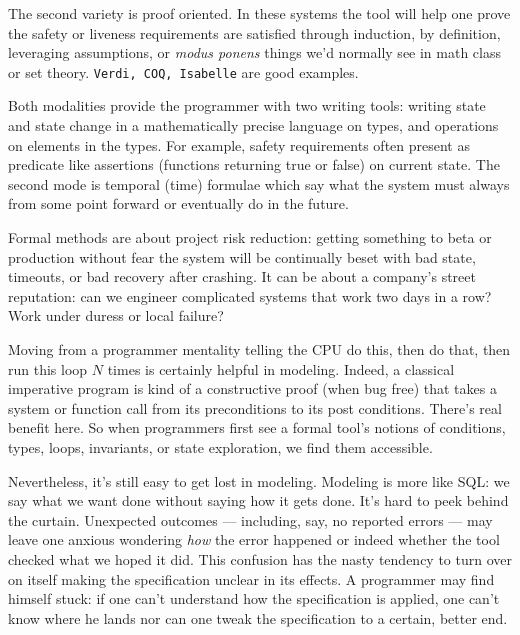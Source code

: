 \documentclass[twocolumn]{article}
\begin{document}
The second variety is proof oriented. In these systems the tool will help one prove the safety or liveness requirements are satisfied through induction, by definition, leveraging assumptions, or \emph{modus ponens} things we'd normally see in math class or set theory. \texttt{Verdi, COQ, Isabelle} are good examples.

Both modalities provide the programmer with two writing tools: writing state and state change in a mathematically precise language on types, and operations on elements in the types. For example, safety requirements often present as predicate like assertions (functions returning true or false) on current state. The second mode is temporal (time) formulae which say what the system must always from some point forward or eventually do in the future.  

Formal methods are about project risk reduction: getting something to beta or production without fear the system will be continually beset with bad state, timeouts, or bad recovery after crashing. It can be about a company's street reputation: can we engineer complicated systems that work two days in a row? Work under duress or local failure?

Moving from a programmer mentality telling the CPU do this, then do that, then run this loop $N$ times is certainly helpful in modeling. Indeed, a classical imperative program is kind of a constructive proof (when bug free) that takes a system or function call from its preconditions to its post conditions. There's real benefit here. So when programmers first see a formal tool's notions of conditions, types, loops, invariants, or state exploration, we find them accessible. 

Nevertheless, it's still easy to get lost in modeling. Modeling is more like SQL: we say what we want done without saying how it gets done. It's hard to peek behind the curtain. Unexpected outcomes --- including, say, no reported errors --- may leave one anxious wondering \emph{how} the error happened or indeed whether the tool checked what we hoped it did. This confusion has the nasty tendency to turn over on itself making the specification unclear in its effects. A programmer may find himself stuck: if one can't understand how the specification is applied, one can't know where he lands nor can one tweak the specification to a certain, better end.
\end{document}
